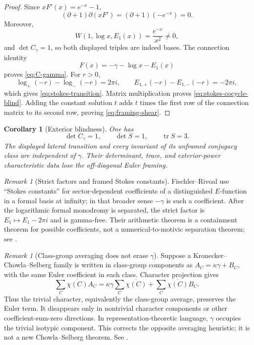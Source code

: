 \documentclass[11pt]{article}
\newtheorem{corollary}[theorem]{Corollary}
\theoremstyle{definition}
\theoremstyle{remark}
\newtheorem{remark}[theorem]{Remark}
\begin{document}
\begin{proof}
Since \(xF'(x)=e^{-x}-1\),
\[
 (\partial+1)\partial(xF')=(\partial+1)(-e^{-x})=0.
\]
Moreover,
\[
 W(1,\log x,E_1(x))=\frac{e^{-x}}{x^2}\ne0,
\]
and \(\det C_\gamma=1\), so both displayed triples are indeed bases.
The connection identity
\[
 F(x)=-\gamma-\log x-E_1(x)
\]
proves \eqref{eq:C-gamma}.  For \(r>0\),
\[
 \log_+(-r)-\log_-(-r)=2\pi i,
 \qquad
 E_{1,+}(-r)-E_{1,-}(-r)=-2\pi i,
\]
which gives \eqref{eq:stokes-transition}.  Matrix multiplication proves
\eqref{eq:stokes-cocycle-blind}.  Adding the constant solution \(t\) adds
\(t\) times the first row of the connection matrix to its second row,
proving \eqref{eq:framing-shear}.
\end{proof}

\begin{corollary}[Exterior blindness]
\label{cor:stokes-exterior-blind}
One has
\[
 \det C_\gamma=1,
 \qquad \det S=1,
 \qquad \operatorname{tr}S=3.
\]
The displayed lateral transition and every invariant of its unframed
conjugacy class are independent of \(\gamma\).  Their determinant, trace,
and exterior-power characteristic data lose the off-diagonal Euler framing.
\end{corollary}

\begin{remark}[Strict factors and framed Stokes constants]
Fischler--Rivoal use ``Stokes constants'' for sector-dependent coefficients
of a distinguished \(E\)-function in a formal basis at infinity; in that
broader sense \(-\gamma\) is such a coefficient.  After the logarithmic
formal monodromy is separated, the strict factor is
\(E_1\mapsto E_1-2\pi i\) and is gamma-free.  Their arithmetic theorem is a
containment theorem for possible coefficients, not a numerical-to-motivic
separation theorem; see \cite{FischlerRivoal2016}.
\end{remark}

\begin{remark}[Class-group averaging does not erase \(\gamma\)]
\label{rem:Chowla-Selberg-correction}
Suppose a Kronecker--Chowla--Selberg family is written in class-group
components as \(A_C=\kappa\gamma+B_C\), with the same Euler coefficient in
each class.  Character projection gives
\[
 \sum_C\overline{\chi(C)}A_C
 =\kappa\gamma\sum_C\overline{\chi(C)}
 +\sum_C\overline{\chi(C)}B_C.
\]
Thus the trivial character, equivalently the class-group average, preserves
the Euler term.  It disappears only in nontrivial character components or
other coefficient-sum-zero directions.  In representation-theoretic
language, \(\gamma\) occupies the trivial isotypic component.  This corrects
the opposite averaging heuristic; it is not a new Chowla--Selberg theorem.
See \cite{GrossCS}.
\end{remark}
\end{document}
